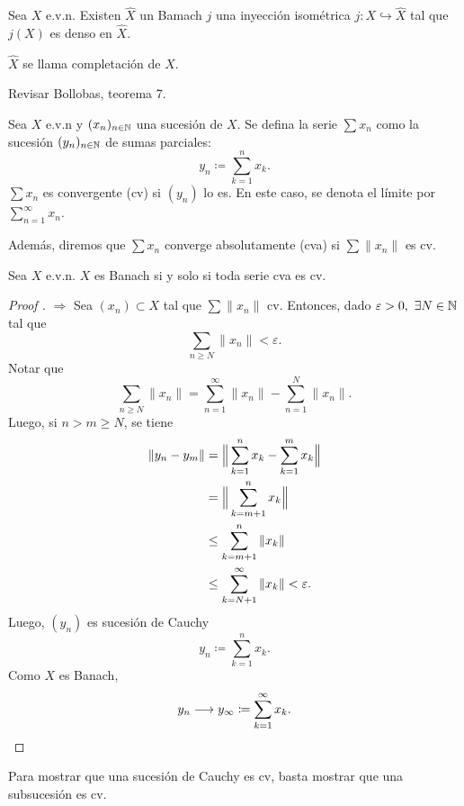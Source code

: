 \begin{theorem}
	Sea $X$ e.v.n. Existen $\hat{X}$ un Bamach  $j$ una inyección isométrica $j \colon X \hookrightarrow \hat{X}$ tal que $j(X)$ es denso en $\hat{X}$. \par
	$\hat{X}$ se llama completación de $X$.
\end{theorem}

\begin{note}
	Revisar Bollobas, teorema 7.
\end{note}

\begin{definition}
	Sea $X$ e.v.n y $(x_{n})_{n \in \mathbb{N}}$ una sucesión de $X$. Se defina la serie $\sum x_{n}$ como la sucesión $(y_{n})_{n \in \mathbb{N}}$ de sumas parciales:
	\[ y_{n} \coloneq \sum_{k=1}^{n} x_{k}. \]
	$\sum x_{n}$ es convergente (cv) si $(y_{n})$ lo es. En este caso, se denota el límite por $\sum_{n = 1}^{\infty} x_{n}$. \par
	Además, diremos que $\sum x_{n}$ converge absolutamente (cva) si $\sum \| x_{n} \|$ es cv.
\end{definition}

\begin{prop}
	Sea $X$ e.v.n. $X$ es Banach si y solo si toda serie cva es cv.
\end{prop}
\begin{proof}[Proof ]
	$\boxed{\Rightarrow}$ Sea $(x_{n}) \subset X$ tal que $\sum \| x_{n} \|$ cv. Entonces, dado $\varepsilon > 0,\ \exists N \in \N$ tal que
	\[ \sum_{n \geq N} \| x_{n} \| < \varepsilon. \]
	Notar que
	\[ \sum_{n \geq N} \| x_{n} \| = \sum_{n = 1}^{\infty} \| x_{n} \| - \sum_{n = 1}^{N} \| x_{n} \|. \]
	Luego, si $n > m \geq N$, se tiene
	\begin{align*}
		\| y_{n} - y_{m} \| &= \Big{\|} \sum_{k = 1}^{n} x_{k} - \sum_{k = 1}^{m} x_{k} \Big{\|} \\
		&= \Big{\|} \sum_{k = m + 1}^{n} x_{k} \Big{\|} \\
		&\leq \sum_{k = m + 1}^{n} \| x_{k} \| \\
		&\leq \sum_{k = N + 1}^{\infty} \| x_{k} \| < \varepsilon
	.\end{align*}
	Luego, $(y_{n})$ es sucesión de Cauchy
	\[ y_{n} \coloneq \sum_{k=1}^{n} x_{k}. \]
	Como $X$ es Banach,
	\[ y_{n} \longrightarrow y_{\infty} \coloneq \sum_{k=1}^{\infty} x_{k}. \qedhere \]
\end{proof}
\begin{observe}
	Para mostrar que una sucesión de Cauchy es cv, basta mostrar que una subsucesión es cv.
\end{observe}
